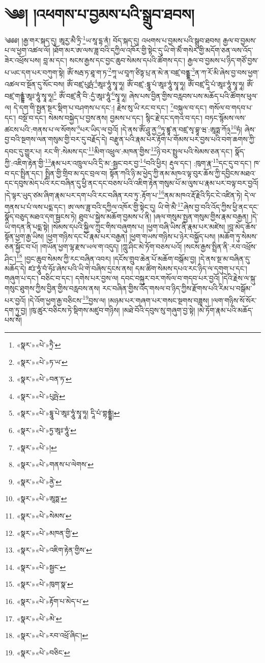 \chapter{༄༅། །འཕགས་པ་བྱམས་པའི་སྒྲུབ་ཐབས།}༄༅༅། །རྒྱ་གར་སྐད་དུ། ཨཱརྱ་མཻ་ཏྲི་\footnote{«སྣར་»«པེ་»ཏྲཻ་}ཡ་སཱ་དྷ་ནཾ། བོད་སྐད་དུ། འཕགས་པ་བྱམས་པའི་སྒྲུབ་ཐབས། རྒྱལ་བ་བྱམས་པ་ལ་ཕྱག་འཚལ་ལོ། །ཐོག་མར་ཨ་ལས་ཟླ་བའི་དཀྱིལ་འཁོར་གྱི་སྟེང་དུ་ཡི་གེ་མཻཾ་གསེར་གྱི་མདོག་ཅན་ལས་འོད་ཟེར་འཕྲོས་པས། བླ་མ་དང་། སངས་རྒྱས་དང་བྱང་ཆུབ་སེམས་དཔའི་ཚོགས་དང་། རྒྱལ་བ་བྱམས་པ་ཉིད་གཙོ་བྱས་པ་ཡང་དག་པར་བཀུག་སྟེ། ཨོཾ་སརྦ་ཏ་ཐཱ་ག་ཏ་\footnote{«སྣར་»«པེ་»ཏ་ཡ་}ཀཱ་ཡ་བཱཀ་ཙིཏྟ་པྲ་ན་མེ་ན་བཛྲ་བནྡྷ་\footnote{«སྣར་»«པེ་»བན་ཏ་}ན་ཀ་རོ་མི་ཞེས་བྱ་བས་ཕྱག་འཚལ་བ་སྔོན་དུ་སོང་བས། ཨོཾ་བཛྲ་པུཥྤཾ་\footnote{«སྣར་»«པེ་»པུཥྤེ་}ཨཱཿ་ཧཱུཾ་སྭཱ་ཧཱ། ཨོཾ་བཛྲ་:དྷཱུ་པཾ་ཨཱཿ་ཧཱུཾ་སྭཱ་ཧཱ། ཨོཾ་བཛྲ་དཱི་པཾ་ཨཱཿ་ཧཱུཾ་སྭཱ་ཧཱ། ཨོཾ་བཛྲ་གནྡྷཾ་ཨཱཿ་ཧཱུཾ་སྭཱ་ཧཱ།\footnote{«སྣར་»«པེ་»དྷཱུ་པེ་ཨཱཿ་ཧཱུཾ་སྭཱ་ཧཱ། དཱི་པཾ་གྷནྡྷཾ།} ཨོཾ་བཛྲ་ནཻ་བི་:དྱཾ་ཨཱཿ་ཧཱུཾ་\footnote{«སྣར་»«པེ་»ཏྱ་ཨཱཿ་ཧཱུཾ་}སྭཱ་ཧཱ། ཞེས་པས་བྱིན་གྱིས་བརླབས་པས་མཆོད་པའི་ཚོགས་ཕུལ་ལ། དེ་དག་གི་སྤྱན་སྔར་སྡིག་པ་བཤགས་པ་དང་:། རྗེས་སུ་ཡི་རང་བ་དང་། \footnote{«སྣར་»«པེ་»།  }བསྐུལ་བ་དང་། གསོལ་བ་གདབ་པ་དང་། བསྔོ་བ་དང་། སེམས་བསྐྱེད་པ་བྱས་ནས། བྱམས་པ་དང་། སྙིང་རྗེ་དང་དགའ་བ་དང་། བཏང་སྙོམས་ལས་ཚངས་པའི་:གནས་པ་ལ་སོགས་\footnote{«སྣར་»«པེ་»གནས་པ་ལེགས་}པར་ཡིད་ལ་བྱའོ། །དེ་ནས་ཨོཾ་ཤཱུ་ནྱ་\footnote{«སྣར་»«པེ་»ནྱེ་}ཏཱ་ཛྙཱ་ན་བཛྲ་སྭ་བྷཱ་ཝ་:ཨཱཏྨ་ཀོ྅\footnote{«སྣར་»«པེ་»ཨཱཏྨ་}ཧཾ། ཞེས་བྱ་བའི་སྔགས་ལན་གསུམ་གྱི་བར་དུ་བརྗོད་དེ། བརྫུན་པའི་རྣམ་པར་རྟོག་པ་གོམས་པར་བྱས་པའི་བག་ཆགས་ཀྱི་དབང་དུ་གྱུར་པ། རང་གི་:སེམས་དང་\footnote{«སྣར་»«པེ་»སེམས་}མིག་འཕྲུལ་:མཁན་གྱིས་\footnote{«སྣར་»«པེ་»མཁན་གྱི་}ཉེ་བར་སྤྲུལ་པའི་སེམས་ཅན་དང་། སྣོད་ཀྱི་:འཇིག་རྟེན་གྱི་\footnote{«སྣར་»«པེ་»འཇིག་རྟེན་གྱིས་}རྣམ་པར་འཁྲུལ་པའི་དྲི་མ་:སྦྱང་བར་བྱ་\footnote{«སྣར་»«པེ་»སྦྱང་}བའི་ཕྱིར། རྡུལ་དང་། :ཁུག་རྣ་\footnote{«སྣར་»«པེ་»ཁུག་སྣ་}དང་དུ་བ་དང་། ཁ་བ་དང་སྤྲིན་དང་། སྤྲིན་གྱི་གྲིབ་མ་དང་བྲལ་བ། སྟོན་ཀའི་ཉི་མ་ཕྱེད་ཀྱི་ནམ་མཁའ་ལྟ་བུར་ཆོས་ཀྱི་དབྱིངས་མཐའ་དང་དབུས་མེད་པའི་རང་བཞིན་དུ་ཕྱི་ནང་དང་བཅས་པའི་འཇིག་རྟེན་གསུམ་པོ་མ་ལུས་པ་རྣམ་པར་བལྟ་བར་བྱའོ། །དེ་ལྟར་ཡུད་ཙམ་ཞིག་རྣམ་པར་དག་པའི་རང་བཞིན་རབ་ཏུ་:རྟོག་པ་\footnote{«སྣར་»«པེ་»རྟོག་པ་མེད་པ་}ནམ་མཁའ་རྡོ་རྗེའི་ཏིང་ངེ་འཛིན་ཏེ། དེ་ལ་གནས་པ་པཾ་ལས་པདྨ་དང་། ཨ་ལས་ཟླ་བའི་དཀྱིལ་འཁོར་གྱི་སྟེང་དུ། ཡི་གེ་མཻ་\footnote{«སྣར་»«པེ་»མེ་}ཞེས་བྱ་བའི་འོད་ཀྱིས་ཕྱི་ནང་དང་སྣོད་བཅུད་མཐའ་དག་སྦྱངས་ཏེ། ཐུབ་པ་སྐྱེས་མཆོག་བྱམས་པ་ནི། །ཞལ་གསུམ་སྤྱན་གསུམ་གྱིས་རྣམ་བརྒྱན། །དེ་ཡི་གདན་ནི་པདྨ་སྟེ། །སེམས་དཔའི་སྐྱིལ་ཀྲུང་གིས་བཞུགས་པ། །ཕྱག་བཞི་ཡིས་ནི་རྣམ་པར་མཛེས། །བླ་མེད་ཆོས་སྟོན་ཕྱག་རྒྱ་ཡིས། །ཕྱག་གཉིས་དང་པོ་རྣམ་པར་བརྒྱན། །ཕྱག་གཡས་གཉིས་པ་ཉེར་བསྐྱོད་པས། །མཆོག་ཏུ་སེམས་ཅན་སྐྱོང་བ་པོ། །གཡོན་ཕྱག་ལྷ་རྫས་ཡལ་ག་འདུད། །ཀླུ་ཤིང་མེ་ཏོག་བཅས་པའོ། །སངས་རྒྱས་སྤྲིན་ནི་:རབ་འཕྲོས་ཤིང་།\footnote{«སྣར་»«པེ་»རབ་འཕྲོ་ཞིང་།} །བྱང་ཆུབ་སེམས་ཀྱི་རང་བཞིན་འབར། །དངོས་གྲུབ་ཆེན་པོ་མཆོག་བསྒོམ་བྱ། །དེ་ནས་སྔ་མ་བཞིན་དུ་མཆོད་དེ། ཛཿ་ཧཱུཾ་བཾ་ཧོཿ་ཞེས་པའི་ཡི་གེ་བཞིས་དྲངས་ནས། དམ་ཚིག་སེམས་དཔའ་རང་ཉིད་ལ་དགུག་པ་དང་། གཞུག་པ་དང་། བཅིང་བ་དང་། དགེས་པར་བྱས་ལ། དབང་བསྐུར་བར་གསོལ་བ་གདབ་པར་བྱའོ། །དེའི་རྗེས་ལ་སྐུ་གསུང་ཐུགས་ཀྱིས་བྱིན་གྱིས་བརླབས་ནས། རང་བཞིན་གྱིས་འོད་གསལ་བ་ཉིད་ཀྱིས་རྫོགས་པའི་རིམ་པ་བསྒོམ་པར་བྱའོ། །དེ་འོག་ཕྱག་རྒྱ་བཅིངས་\footnote{«སྣར་»«པེ་»བཅིང་}བྱས་ལ། །མཉམ་པར་གཞག་པར་གསང་སྔགས་བཟླས། །ལག་གཉིས་སོ་སོར་དག་ཏུ་བྱ། །ཁུ་ཚུར་བཅིངས་ཏེ་སྡིགས་མཛུབ་གཉིས། །མཐེ་བོའི་དབུས་སུ་གཞུག་བྱ་སྟེ། །མེ་ཏོག་རྣམ་པའི་མཆོད་པས་སོ། 